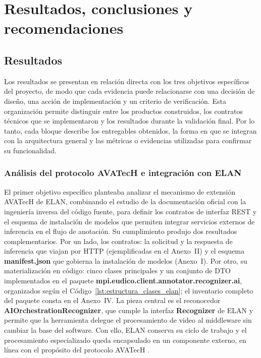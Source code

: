 \section[RESULTADOS, CONCLUSIONES Y RECOMENDACIONES]{Resultados, conclusiones y recomendaciones}

\subsection{Resultados}

Los resultados se presentan en relación directa con los tres objetivos específicos del proyecto, de modo que cada evidencia puede relacionarse con una decisión de diseño, una acción de implementación y un criterio de verificación. Esta organización permite distinguir entre los productos construidos, los contratos técnicos que se implementaron y los resultados durante la validación final. Por lo tanto, cada bloque describe los entregables obtenidos, la forma en que se integran con la arquitectura general y las métricas o evidencias utilizadas para confirmar su funcionalidad.

\subsubsection{Análisis del protocolo AVATecH e integración con ELAN}

El primer objetivo específico planteaba analizar el mecanismo de extensión AVATecH de ELAN, combinando el estudio de la documentación oficial con la ingeniería inversa del código fuente, para definir los contratos de interfaz REST y el esquema de instalación de modelos que permiten integrar servicios externos de inferencia en el flujo de anotación. Su cumplimiento produjo dos resultados complementarios. Por un lado, los contratos: la solicitud y la respuesta de inferencia que viajan por HTTP (ejemplificadas en el Anexo~II) y el esquema \textbf{manifest.json} que gobierna la instalación de modelos (Anexo~I). Por otro, su materialización en código: cinco clases principales y un conjunto de DTO implementados en el paquete \textbf{mpi.eudico.\allowbreak{}client.\allowbreak{}annotator.\allowbreak{}recognizer.\allowbreak{}ai}, organizados según el Código~\ref{lst:estructura_clases_elan}; el inventario completo del paquete consta en el Anexo~IV. La pieza central es el reconocedor \textbf{AIOrchestrationRecognizer}, que cumple la interfaz \textbf{Recognizer} de ELAN y permite que la herramienta delegue el procesamiento de video al middleware sin cambiar la base del software. Con ello, ELAN conserva su ciclo de trabajo y el procesamiento especializado queda encapsulado en un componente externo, en línea con el propósito del protocolo AVATecH \cite{auer2014avatech}.

